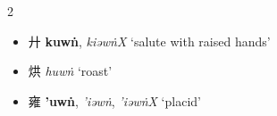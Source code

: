 \begin{multicols}{2}
\begin{itemize}






   
\end{itemize}

\medskip

\begin{itemize}
  \item {\Large{廾}} %
    {\large{\textbf{kuwṅ}}},
    \textit{kiəwṅX} `salute with raised hands' %




  \item {\Large{烘}} %
    \textit{huwṅ} `roast' %
\end{itemize}

\medskip

\begin{minipage}{\columnwidth}
\begin{itemize}[leftmargin=*, labelsep=0.5em]  
    \item {\Large{雍}} 
    {\large{\textbf{'uwṅ}}},
 \textit{'iəwṅ}, \textit{'iəwṅX}
 `placid'  %


\end{itemize}
\end{minipage}
\end{multicols}
